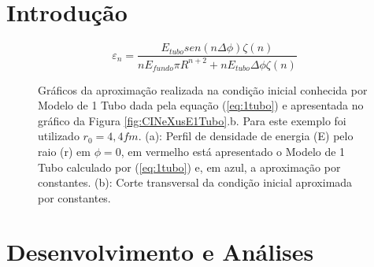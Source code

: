 \documentclass[a4paper,12pt]{article}
\begin{document}
\title{}

\author{Aluno: Rafael M. Miller NUSP.: 7581818}

\maketitle

\section{Introdução}

\begin{equation}
\varepsilon_n = \frac{E_{tubo} sen(n \Delta \phi) \zeta(n)}{n E_{fundo} \pi R^{n+2} + n  E_{tubo} \Delta \phi \zeta(n)}
\label{eq:analitical_epsilon_n}
\end{equation}


\begin{figure}[H]
  \centering

  \caption{Gráficos da aproximação realizada na condição inicial conhecida por Modelo de 1 Tubo dada pela equação (\ref{eq:1tubo}) e apresentada no gráfico da Figura \ref{fig:CINeXusE1Tubo}.b. Para este exemplo foi utilizado $r_0 = 4,4 fm$. (a): Perfil de densidade de energia (E) pelo raio (r) em $\phi = 0$, em vermelho está apresentado o Modelo de 1 Tubo calculado por (\ref{eq:1tubo}) e, em azul, a aproximação por constantes. (b): Corte transversal da condição inicial aproximada por constantes.}
  \label{fig:AproxModelo1Tubo}
\end{figure}

\section{Desenvolvimento e Análises}
\end{document}
